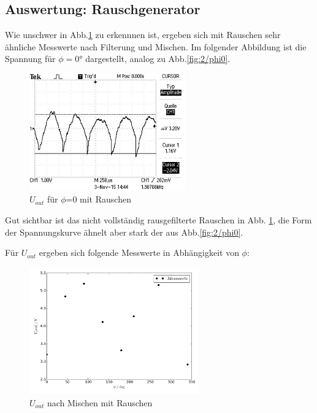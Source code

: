 \subsection{Auswertung: Rauschgenerator}

Wie unschwer in Abb.\ref{fig:3/phi0} zu erkennnen ist, ergeben sich mit Rauschen
sehr ähnliche
Messwerte nach Filterung und Mischen. Im folgender Abbildung ist die
Spannung für $\phi=0°$ dargestellt, analog zu Abb.\ref{fig:2/phi0}.

\begin{figure}[H]
  \centering
  \includegraphics[angle=90,width=0.6\textwidth, height=0.3\textwidth]{graphics/ALL0039/F0039TEK.jpg}
  \caption{$U_{out}$ für $\phi$=0 mit Rauschen}
  \label{fig:3/phi0}
\end{figure}

Gut sichtbar ist das nicht vollständig rausgefilterte Rauschen in Abb.
\ref{fig:3/phi0}, die Form der
Spannungskurve ähnelt aber stark der aus Abb.\ref{fig:2/phi0}.

\newpage
Für $U_{out}$ ergeben sich folgende Messwerte in Abhängigkeit von $\phi$:

\begin{figure}[H]
  \centering
  \includegraphics[width=0.65\textwidth, height=0.35\textwidth]{plot3u.pdf}
  \caption{$U_{out}$ nach Mischen mit Rauschen}
  \label{fig:plot3u}
\end{figure}

